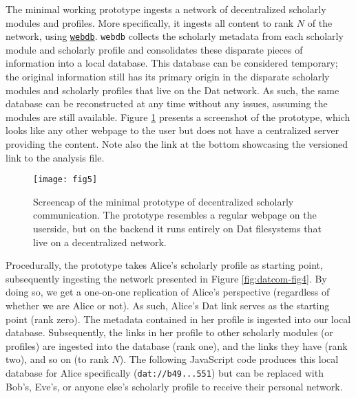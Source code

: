 \documentclass[publications,article,submit,moreauthors,pdftex,10pt,a4paper]{Definitions/mdpi}
\begin{document}
The minimal working prototype ingests a network of decentralized
scholarly modules and profiles. More specifically, it ingests all
content to rank \(N\) of the network, using
\href{https://github.com/beakerbrowser/webdb}{\texttt{webdb}}.
\texttt{webdb} collects the scholarly metadata from each scholarly
module and scholarly profile and consolidates these disparate pieces of
information into a local database. This database can be considered
temporary; the original information still has its primary origin in the
disparate scholarly modules and scholarly profiles that live on the Dat
network. As such, the same database can be reconstructed at any time
without any issues, assuming the modules are still available. Figure
\ref{fig:datcom-fig5} presents a screenshot of the prototype, which
looks like any other webpage to the user but does not have a centralized
server providing the content. Note also the link at the bottom
showcasing the versioned link to the analysis file.

\begin{figure}

{\centering \texttt{[image: fig5]} 

}

\caption{Screencap of the minimal prototype of decentralized scholarly communication. The prototype resembles a regular webpage on the userside, but on the backend it runs entirely on Dat filesystems that live on a decentralized network.}\label{fig:datcom-fig5}
\end{figure}

Procedurally, the prototype takes Alice's scholarly profile as starting
point, subsequently ingesting the network presented in Figure
\ref{fig:datcom-fig4}. By doing so, we get a one-on-one replication of
Alice's perspective (regardless of whether we are Alice or not). As
such, Alice's Dat link serves as the starting point (rank zero). The
metadata contained in her profile is ingested into our local database.
Subsequently, the links in her profile to other scholarly modules (or
profiles) are ingested into the database (rank one), and the links they
have (rank two), and so on (to rank \(N\)). The following JavaScript
code produces this local database for Alice specifically
(\texttt{dat://b49...551}) but can be replaced with Bob's, Eve's, or
anyone else's scholarly profile to receive their personal network.
\end{document}
